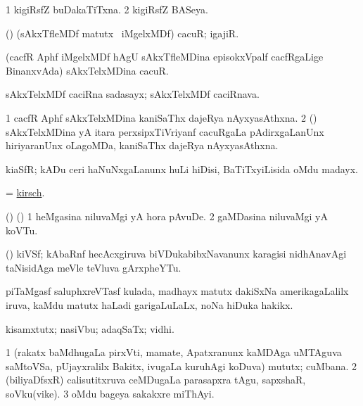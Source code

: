 \bentry
{}
\gl{\gu}
\bmng
\bnum
\num{1} kigiRsfZ buDakaTiTxna. 
\num{2} kigiRsfZ BASeya. 
\enum
\emng
\eentry

\bentry
{}
\gl{\nA}
\bmng
(\birx) (sAkxTfleMDf matutx \kanu\ iMgelxMDf) cacuR; igajiR. 
\emng

\noindent\gl{\pagu}
\bmng
{} (cacfR Aphf iMgelxMDf hAgU sAkxTfleMDina episokxVpalf cacfRgaLige BinanxvAda) sAkxTelxMDina cacuR. 
\emng
\eentry

\bentry
{}
\gl{\nA}
\bmng
sAkxTelxMDf caciRna sadasayx; sAkxTelxMDf caciRnava. 
\emng
\eentry

\bentry
{}
\gl{\nA}
\bmng
\bnum
\num{1} cacfR Aphf sAkxTelxMDina kaniSaThx dajeRya nAyxyasAthxna. 
\num{2} (\ca) sAkxTelxMDina yA itara perxsipxTiVriyanf cacuRgaLa pAdirxgaLanUnx hiriyaranUnx oLagoMDa, kaniSaThx dajeRya nAyxyasAthxna. 
\enum
\emng
\eentry

\bentry
{}
\gl{\nA}
\bmng
kiaSfR; kADu ceri haNuNxgaLanunx huLi hiDisi, BaTiTxyiLisida oMdu madayx. 
\emng
\eentry

\bentry
{}
\gl{\nA}
\bmng
 = \hyperlink{kirsch}{kirsch}. 
\emng
\eentry

\bentry
{}
\gl{\nA}
\bmng
(\birx) (\pArxparx) 
\bnum
\num{1} heMgasina niluvaMgi yA hora pAvuDe. 
\num{2} gaMDasina niluvaMgi yA koVTu. 
\enum
\emng
\eentry

\bentry
{}
\gl{\nA}
\bmng
(\ravi) kiVSf; kAbaRnf hecAcxgiruva biVDukabibxNavanunx karagisi nidhAnavAgi taNisidAga meVle teVluva gArxpheYTu. 
\emng
\eentry

\bentry
{}
\gl{\nA}
\bmng
piTaMgasf saluphxreVTasf kulada, madhayx matutx dakiSxNa amerikagaLalilx iruva, kaMdu matutx haLadi garigaLuLaLx, noNa hiDuka hakikx. 
\emng
\eentry

\bentry
{}
\gl{\nA}
\bmng
kisamxtutx; nasiVbu; adaqSaTx; vidhi. 
\emng
\eentry

\bentry
{}
\gl{\nA}
\bmng
\bnum
\num{1} (rakatx baMdhugaLa pirxVti, mamate, Apatxranunx kaMDAga uMTAguva saMtoVSa, pUjayxralilx Bakitx, ivugaLa kuruhAgi koDuva) mututx; cuMbana. 
\num{2} (biliyaDfsxR) calisutitxruva ceMDugaLa parasapxra tAgu, sapxshaR, soVku(vike). 
\num{3} oMdu bageya sakakxre miThAyi. 
\enum
\emng

